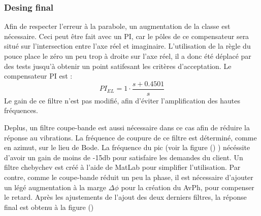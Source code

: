 \documentclass{udes_rapport} %
\begin{document}
\subsubsection{Desing final}
Afin de respecter l'erreur à la parabole, un augmentation de la classe est nécessaire. Ceci peut être fait avec un PI, car le pôles de ce compensateur sera situé sur l'intersection entre l'axe réel et imaginaire. L'utilisation de la règle du pouce place le zéro un peu trop à droite sur l'axe réel, il a donc été déplacé par des tests jusqu'à obtenir un point satifesant les critères d'acceptation. Le compensateur PI est :
\[PI_{EL} = 1 \cdot \frac{s+0.4501}{s}\]
Le gain de ce filtre n'est pas modifié, afin d'éviter l'amplification des hautes fréquences.

Deplus, un filtre coupe-bande est aussi nécessaire dans ce cas afin de réduire la réponse au vibrations. La fréquence de coupure de ce filtre est déterminé, comme en azimut, sur le lieu de Bode. La fréquence du pic (voir la figure () ) nécéssite d'avoir un gain de moins de -15db pour satisfaire les demandes du client. Un filtre chebychev est créé à l'aide de MatLab pour simplifier l'utilisation. Par contre, comme le coupe-bande réduit un peu la phase, il est nécessaire d'ajouter un légé augmentation à la marge $\Delta \phi$ pour la création du AvPh, pour compenser le retard.
Après les ajustements de l'ajout des deux derniers filtres, la réponse final est obtenu à la figure () 





\newpage
\end{document}

